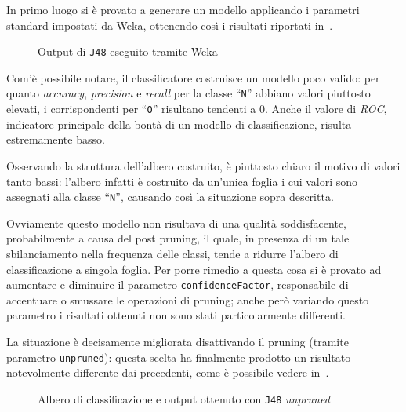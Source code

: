 In primo luogo si è provato a generare un modello applicando i parametri standard impostati da Weka, ottenendo così i risultati riportati in~.

\begin{figure}[H]
  \centering
  \caption{Output di \texttt{J48} eseguito tramite Weka}%
  \label{fig:j48}
\end{figure}

Com'è possibile notare, il classificatore costruisce un modello poco valido:
per quanto \emph{accuracy}, \emph{precision} e \emph{recall} per la classe ``\texttt{N}'' abbiano valori piuttosto elevati,
i corrispondenti per ``\texttt{O}'' risultano tendenti a \(0\).
Anche il valore di \emph{ROC}, indicatore principale della bontà di un modello di classificazione, risulta estremamente basso.

Osservando la struttura dell'albero costruito, è piuttosto chiaro il motivo di valori tanto bassi:
l'albero infatti è costruito da un'unica foglia i cui valori sono assegnati alla classe ``\texttt{N}'', causando così la situazione sopra descritta.

Ovviamente questo modello non risultava di una qualità soddisfacente, probabilmente a causa del post pruning,
il quale, in presenza di un tale sbilanciamento nella frequenza delle classi, tende a ridurre l'albero di classificazione a singola foglia.
Per porre rimedio a questa cosa si è provato ad aumentare e diminuire il parametro \texttt{confidenceFactor}, responsabile di accentuare o smussare le operazioni di pruning;
anche però variando questo parametro i risultati ottenuti non sono stati particolarmente differenti.

La situazione è decisamente migliorata disattivando il pruning (tramite parametro \texttt{unpruned}):
questa scelta ha finalmente prodotto un risultato notevolmente differente dai precedenti, come è possibile vedere in~.

\begin{figure}[H]
  \centering
  \begin{subfigure}{0.35\textwidth}
    \centering
    \label{fig:j48-unpruned:tree}
  \end{subfigure}
  \hfill
  \begin{subfigure}{0.6\textwidth}
    \centering
    \label{subfig:j48-unpruned:result}
  \end{subfigure}
  \caption{Albero di classificazione e output ottenuto con \texttt{J48} \emph{unpruned}}%
  \label{fig:j48-unpruned}
\end{figure}

